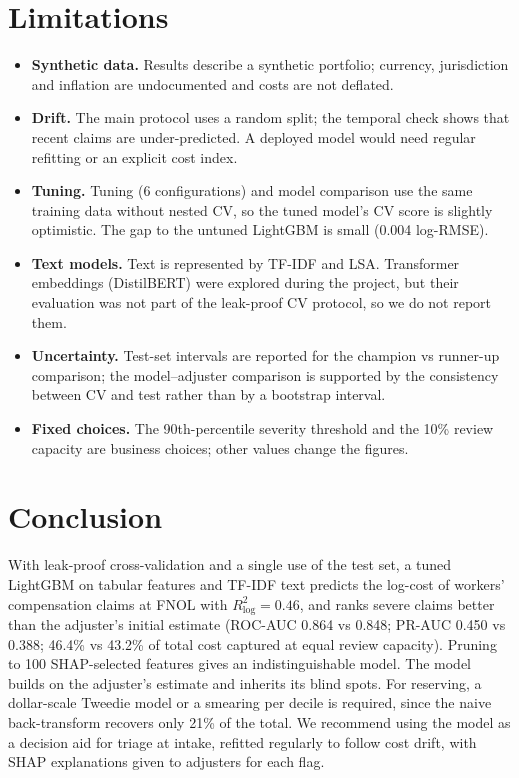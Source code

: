 \documentclass[10pt,twocolumn,letterpaper]{article}
\begin{document}
\section{Limitations}
\begin{itemize}
    \item \textbf{Synthetic data.} Results describe a synthetic portfolio; currency, jurisdiction and inflation are
    undocumented and costs are not deflated.
    \item \textbf{Drift.} The main protocol uses a random split; the temporal check shows that recent claims are
    under-predicted. A deployed model would need regular refitting or an explicit cost index.
    \item \textbf{Tuning.} Tuning (6 configurations) and model comparison use the same training data without nested CV,
    so the tuned model's CV score is slightly optimistic. The gap to the untuned LightGBM is small (0.004 log-RMSE).
    \item \textbf{Text models.} Text is represented by TF-IDF and LSA. Transformer embeddings (DistilBERT) were explored
    during the project, but their evaluation was not part of the leak-proof CV protocol, so we do not report them.
    \item \textbf{Uncertainty.} Test-set intervals are reported for the champion vs runner-up comparison; the
    model--adjuster comparison is supported by the consistency between CV and test rather than by a bootstrap interval.
    \item \textbf{Fixed choices.} The 90th-percentile severity threshold and the 10\% review capacity are business
    choices; other values change the figures.
\end{itemize}

\section{Conclusion}
With leak-proof cross-validation and a single use of the test set, a tuned LightGBM on tabular features and TF-IDF text
predicts the log-cost of workers' compensation claims at FNOL with $R^2_{\log}=0.46$, and ranks severe claims better
than the adjuster's initial estimate (ROC-AUC 0.864 vs 0.848; PR-AUC 0.450 vs 0.388; 46.4\% vs 43.2\% of total cost
captured at equal review capacity). Pruning to 100 SHAP-selected features gives an indistinguishable model. The model
builds on the adjuster's estimate and inherits its blind spots. For reserving, a dollar-scale Tweedie model or a smearing
per decile is required, since the naive back-transform recovers only 21\% of the total. We recommend using the model as
a decision aid for triage at intake, refitted regularly to follow cost drift, with SHAP explanations given to adjusters
for each flag.
\end{document}
